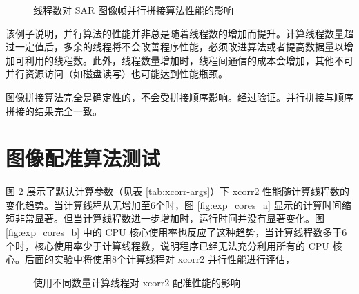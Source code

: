 \begin{figure}[htbp]
\centering
\subfloat[程序计算时间]{
    \label{fig:exp_merge_a}
    \begin{minipage}[t]{0.49\textwidth}
        \centering
        \resizebox {\textwidth} {!} {
            
        }
    \end{minipage}
}
\caption{线程数对 SAR 图像帧并行拼接算法性能的影响} \label{fig:exp_merge}
\end{figure}
 
该例子说明，并行算法的性能并非总是随着线程数的增加而提升。计算线程数量超过一定值后，多余的线程将不会改善程序性能，必须改进算法或者提高数据量以增加可利用的线程数。此外，线程数量增加时，线程间通信的成本会增加，其他不可并行资源访问（如磁盘读写）也可能达到性能瓶颈。

图像拼接算法完全是确定性的，不会受拼接顺序影响。经过验证。并行拼接与顺序拼接的结果完全一致。

\section{图像配准算法测试}

图 \ref{fig:exp_cores} 展示了默认计算参数（见表 \ref{tab:xcorr-args}）下 xcorr2 性能随计算线程数的变化趋势。当计算线程从无增加至6个时，图 \ref{fig:exp_cores_a} 显示的计算时间缩短非常显著。但当计算线程数进一步增加时，运行时间并没有显著变化。图 \ref{fig:exp_cores_b} 中的 CPU 核心使用率也反应了这种趋势，当计算线程数多于6个时，核心使用率少于计算线程数，说明程序已经无法充分利用所有的 CPU 核心。后面的实验中将使用8个计算线程对 xcorr2 并行性能进行评估，

\begin{figure}[htbp]
\centering
\subfloat[程序计算时间]{
    \label{fig:exp_cores_a}
    \begin{minipage}[t]{0.49\textwidth}
        \centering
        \resizebox {\textwidth} {!} {
            
        }
    \end{minipage}
}
\caption{使用不同数量计算线程对 xcorr2 配准性能的影响}
\label{fig:exp_cores}
\end{figure}

